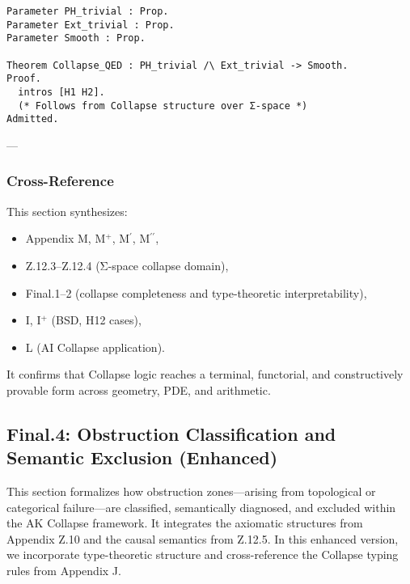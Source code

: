 \documentclass[11pt]{article}
\begin{document}
\begin{axiom}
\begin{axiom}
{{\begin{proposition}
\begin{lstlisting}[language=Coq]
Parameter PH_trivial : Prop.
Parameter Ext_trivial : Prop.
Parameter Smooth : Prop.

Theorem Collapse_QED : PH_trivial /\ Ext_trivial -> Smooth.
Proof.
  intros [H1 H2].
  (* Follows from Collapse structure over Σ-space *)
Admitted.
\end{lstlisting}
\end{proposition}

---

\subsubsection*{Cross-Reference}

This section synthesizes:
\begin{itemize}
  \item Appendix M, M$^+$, M$^\prime$, M$^{\prime\prime}$,
  \item Z.12.3–Z.12.4 (Σ-space collapse domain),
  \item Final.1–2 (collapse completeness and type-theoretic interpretability),
  \item I, I$^+$ (BSD, H12 cases),  
  \item L (AI Collapse application).
\end{itemize}

It confirms that Collapse logic reaches a terminal, functorial, and constructively provable form across geometry, PDE, and arithmetic.




\subsection*{Final.4: Obstruction Classification and Semantic Exclusion (Enhanced)}

This section formalizes how obstruction zones—arising from topological or categorical failure—are classified, semantically diagnosed,  
and excluded within the AK Collapse framework. It integrates the axiomatic structures from Appendix Z.10 and the causal semantics from Z.12.5.  
In this enhanced version, we incorporate type-theoretic structure and cross-reference the Collapse typing rules from Appendix J.

}}
\end{axiom}
\end{axiom}
\end{document}

